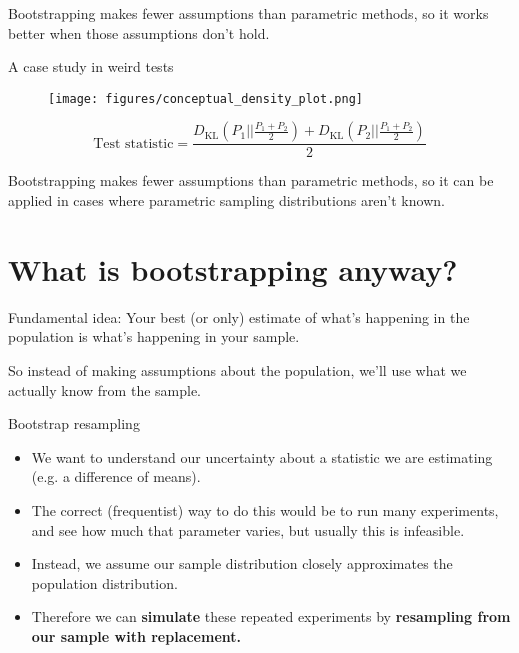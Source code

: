 \documentclass{beamer} %
\begin{document}
\begin{frame}[standout]
Bootstrapping makes fewer assumptions than parametric methods, so it works better when those assumptions don't hold. 
\end{frame}

\begin{frame}{A case study in weird tests}
\begin{figure}
\centering
\texttt{[image: figures/conceptual\_density\_plot.png]}
\end{figure}
$$\text{Test statistic} = \frac{D_\text{KL}\left(P_1 || \frac{P_1 + P_2}{2}\right) + D_\text{KL}\left(P_2 || \frac{P_1 + P_2}{2}\right)}{2}$$
\end{frame}

\begin{frame}[standout]
Bootstrapping makes fewer assumptions than parametric methods, so it can be applied in cases where parametric sampling distributions aren't known. 
\end{frame}

\section{What is bootstrapping anyway?}

\begin{frame}[standout]
Fundamental idea: Your best (or only) estimate of what's happening in the population is what's happening in your sample. 
\end{frame}


\begin{frame}[standout]
So instead of making assumptions about the population, we'll use what we actually know from the sample.
\end{frame}

\begin{frame}{Bootstrap resampling}
\begin{itemize}[<+->] \itemsep 1em
\item We want to understand our uncertainty about a statistic we are estimating (e.g. a difference of means).
\item The correct (frequentist) way to do this would be to run many experiments, and see how much that parameter varies, but usually this is infeasible.
\item Instead, we assume our sample distribution closely approximates the population distribution.
\item Therefore we can \textbf{simulate} these repeated experiments by \textbf{resampling from our sample with replacement.}
\end{itemize}
\end{frame}
\end{document}
